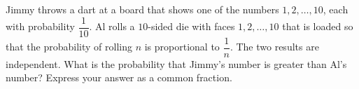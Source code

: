 Jimmy throws a dart at a board that shows one of the numbers $1,2,\dots,10$, each with probability $\dfrac{1}{10}$. Al rolls a $10$-sided die with faces $1,2,\dots,10$ that is loaded so that the probability of rolling $n$ is proportional to $\dfrac{1}{n}$. The two results are independent. What is the probability that Jimmy's number is greater than Al's number? Express your answer as a common fraction.
